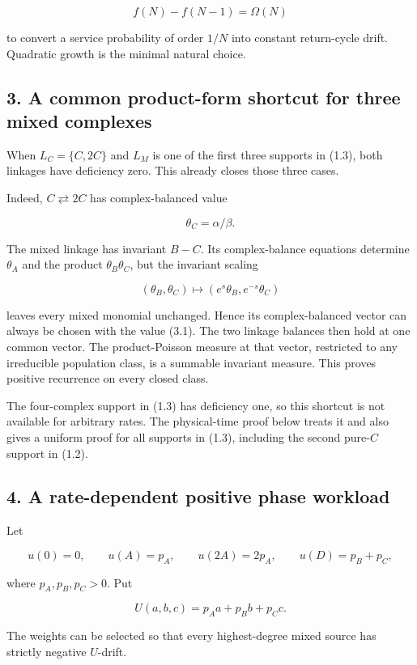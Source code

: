 \[
 f(N)-f(N-1)=\Omega(N)
\tag{2.7}
\]

to convert a service probability of order \(1/N\) into constant
return-cycle drift. Quadratic growth is the minimal natural choice.

\subsection{3. A common product-form shortcut for three mixed
complexes}

When \(L_C=\{C,2C\}\) and \(L_M\) is one of the first three supports in
(1.3), both linkages have deficiency zero. This already closes those
three cases.

Indeed, \(C\rightleftarrows2C\) has complex-balanced value

\[
 \theta_C=\alpha/\beta.
\tag{3.1}
\]

The mixed linkage has invariant \(B-C\). Its complex-balance equations
determine \(\theta_A\) and the product \(\theta_B\theta_C\), but the
invariant scaling

\[
 (\theta_B,\theta_C)\mapsto(e^s\theta_B,e^{-s}\theta_C)
\tag{3.2}
\]

leaves every mixed monomial unchanged. Hence its complex-balanced vector
can always be chosen with the value (3.1). The two linkage balances then
hold at one common vector. The product-Poisson measure at that vector,
restricted to any irreducible population class, is a summable invariant
measure. This proves positive recurrence on every closed class.

The four-complex support in (1.3) has deficiency one, so this shortcut
is not available for arbitrary rates. The physical-time proof below
treats it and also gives a uniform proof for all supports in (1.3),
including the second pure-\(C\) support in (1.2).

\subsection{4. A rate-dependent positive phase
workload}

Let

\[
 u(0)=0,\qquad u(A)=p_A,\qquad u(2A)=2p_A,
 \qquad u(D)=p_B+p_C,
\tag{4.1}
\]

where \(p_A,p_B,p_C>0\). Put

\[
 U(a,b,c)=p_Aa+p_Bb+p_Cc.
\tag{4.2}
\]

The weights can be selected so that every highest-degree mixed source
has strictly negative \(U\)-drift.

